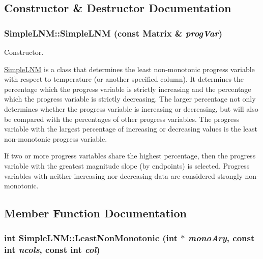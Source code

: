 \subsection{Constructor \& Destructor Documentation}
\hypertarget{classSimpleLNM_a45bd676f6bb504baf1b46ddcbf2f8fb8}{
\subsubsection[{SimpleLNM}]{\setlength{\rightskip}{0pt plus 5cm}SimpleLNM::SimpleLNM (const {\bf Matrix} \& {\em progVar})}}
\label{d8/dfe/classSimpleLNM_a45bd676f6bb504baf1b46ddcbf2f8fb8}


Constructor. 

\hyperlink{classSimpleLNM}{SimpleLNM} is a class that determines the least non-\/monotonic progress variable with respect to temperature (or another specified column). It determines the percentage which the progress variable is strictly increasing and the percentage which the progress variable is strictly decreasing. The larger percentage not only determines whether the progress variable is increasing or decreasing, but will also be compared with the percentages of other progress variables. The progress variable with the largest percentage of increasing or decreasing values is the least non-\/monotonic progress variable.

If two or more progress variables share the highest percentage, then the progress variable with the greatest magnitude slope (by endpoints) is selected. Progress variables with neither increasing nor decreasing data are considered strongly non-\/monotonic. 

\subsection{Member Function Documentation}
\hypertarget{classSimpleLNM_a9d296839ca84467c0f6241b1393bd6d5}{
\subsubsection[{LeastNonMonotonic}]{\setlength{\rightskip}{0pt plus 5cm}int SimpleLNM::LeastNonMonotonic (int $\ast$ {\em monoAry}, \/  const int {\em ncols}, \/  const int {\em col})}}
\label{d8/dfe/classSimpleLNM_a9d296839ca84467c0f6241b1393bd6d5}


